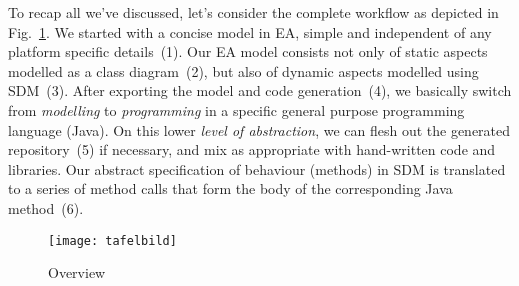 To recap all we've discussed, let's consider the complete workflow as depicted in Fig.~\ref{fig:Overview}. We started with a concise model in EA, simple and
independent of any platform specific details~(1).  Our EA model consists not only of static aspects modelled as a class diagram~(2), but also of dynamic aspects
modelled using SDM~(3).  After exporting the model and code generation~(4), we basically switch from \emph{modelling} to \emph{programming} in a specific
general purpose programming language (Java). On this lower \emph{level of abstraction}, we can flesh out the generated repository~(5) if necessary, and mix as
appropriate with hand-written code and libraries.  Our abstract specification of behaviour (methods) in SDM is translated to a series of method calls that form
the body of the corresponding Java method~(6).


\begin{figure}[htbp]
	\centering
  \texttt{[image: tafelbild]}
	\caption{Overview}
	\label{fig:Overview}
\end{figure}


\clearpage